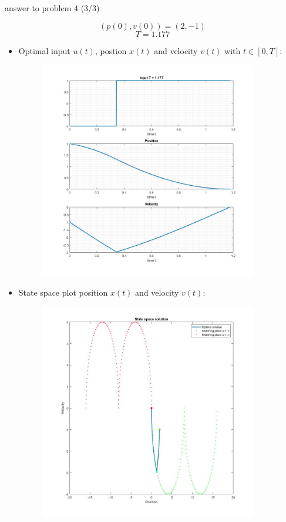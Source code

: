 \documentclass[a4paper]{article}
\begin{document}
	\newpage
	\thispagestyle{empty}
	\noindent	\hrulefill
	\begin{flushright}
		answer to problem 4  (3/3)
	\end{flushright}
	\noindent	\hrulefill
	 $$(p(0),v(0))=(2,-1)$$
	 $$T=1.177$$
	\begin{itemize}
		\item[] Optimal input $u(t)$, postion $x(t)$ and velocity $v(t)$ with $t \in [0,T]$:
		\begin{figure}[h!]
			\centering
			\includegraphics[width=9.5cm]{Solution_init3}
		\end{figure}
		\item[] State space plot position $x(t)$ and velocity $v(t)$:
		\begin{figure}[h!]
			\centering
			\includegraphics[width=9.5cm]{Statespace_init3}
		\end{figure}
	\end{itemize}
\end{document}

